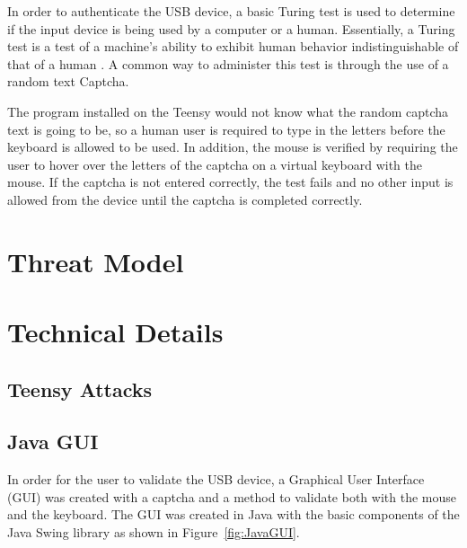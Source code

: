 \documentclass[pagenumbers]{ieee}
\begin{document}
In order to authenticate the USB device, a basic Turing test is used to determine if the input device is being used by a computer or a human. Essentially, a Turing test is a test of a machine's ability to exhibit human behavior indistinguishable of that of a human \cite{turing}. A common way to administer this test is through the use of a random text Captcha. 

The program installed on the Teensy would not know what the random captcha text is going to be, so a human user is required to type in the letters before the keyboard is allowed to be used. In addition, the mouse is verified by requiring the user to hover over the letters of the captcha on a virtual keyboard with the mouse. If the captcha is not entered correctly, the test fails and no other input is allowed from the device until the captcha is completed correctly.


\section{Threat Model}


\section{Technical Details}


\subsection{Teensy Attacks}
\label{section:teensy}


\subsection{Java GUI}
\label{section:gui}
In order for the user to validate the USB device, a Graphical User Interface (GUI) was created with a captcha and a method to validate both with the mouse and the keyboard. The GUI was created in Java with the basic components of the Java Swing \cite{kim} library as shown in Figure~\ref{fig:JavaGUI}.
\end{document}
